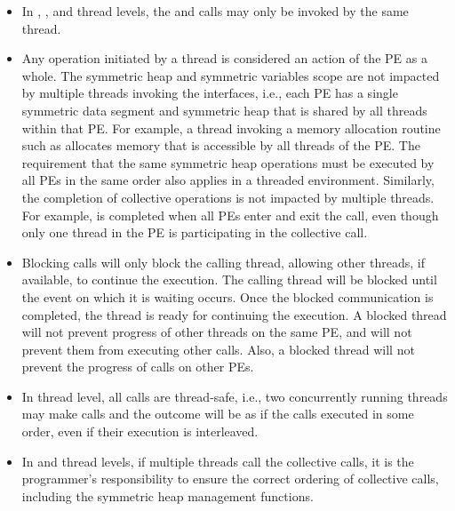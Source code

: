 \begin{itemize}
\item
In , , and  thread
levels, the  and  calls may only be invoked by the same thread.

\item
Any \openshmem operation initiated by a thread is considered an action of the \ac{PE} as a whole.
The symmetric heap and symmetric variables scope
are not impacted by multiple threads invoking the
\openshmem interfaces, i.e., 
each \ac{PE} has a single symmetric data segment and symmetric heap that is shared by
all threads within that \ac{PE}.  For example, a thread invoking a memory allocation
routine such as  
allocates memory that is accessible by all threads of the \ac{PE}. 
The requirement that the same symmetric heap operations must
be executed by all \acp{PE} in the same order also applies in a threaded
environment. Similarly, the completion of collective operations is not impacted by multiple threads. 
For example,  is completed when all \acp{PE} enter and
exit the  call, even though only one thread in the \ac{PE} is
participating in the collective call. 


\item Blocking \openshmem calls will only block the calling thread, allowing
other threads, if available, to continue the execution. The calling thread will be blocked until the
event on which it is waiting occurs. Once the blocked communication is
completed, the thread is ready for continuing the execution. A blocked thread
will not prevent progress of other threads on the same \ac{PE}, and will not
prevent them from executing other \openshmem calls. Also, a blocked thread
will not prevent the progress of \openshmem calls on other \acp{PE}. 

\item In  thread level, all \openshmem calls are thread-safe, 
i.e., two concurrently running threads may make \openshmem calls and the outcome will be as if the calls executed in
some order, even if their execution is interleaved.

\item In  and  thread levels, 
if multiple threads call the collective calls, it is the programmer's responsibility to ensure the correct ordering of
collective calls, including the symmetric heap management functions.

\end{itemize} 
